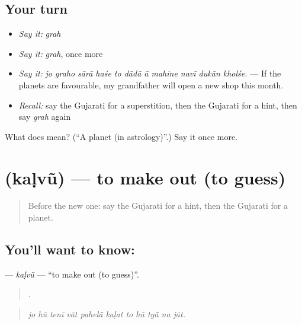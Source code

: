 \subsection*{Your turn}
\begin{itemize}
\raggedright
  \item \emph{Say it:} \emph{grah}
  \item \emph{Say it:} \emph{grah}, once more
  \item \emph{Say it:} \emph{jo graho sārā haśe to dādā ā mahine navī dukān kholśe.} — If the planets are favourable, my grandfather will open a new shop this month.
  \item \emph{Recall:} say the Gujarati for a superstition, then the Gujarati for a hint, then say \emph{grah} again
\end{itemize}

\begin{tcolorbox}[breakable,colback=teal!4,colframe=teal!35!black,title={Before you move on}]
What does  mean? (\textquotedblleft{}A planet (in astrology)\textquotedblright{}.) Say it once more.
\end{tcolorbox}
\section[\texorpdfstring{\gu{કળવું} (kaḷvũ)}{કળવું (kaḷvũ)}]{ (kaḷvũ) — to make out (to guess)}

\label{lesson:GU-C535-kalvu}



\begin{quote}
Before the new one: say the Gujarati for a hint, then the Gujarati for a planet.
\end{quote}

\subsection*{You'll want to know: }
\textbf{} — \emph{kaḷvũ} — \textquotedblleft{}to make out (to guess)\textquotedblright{}.

\begin{quote}
          .
\end{quote}

\begin{quote}
\emph{jo hũ tenī vāt pahelā̃ kaḷat to hũ tyā̃ na jāt.}
\end{quote}


